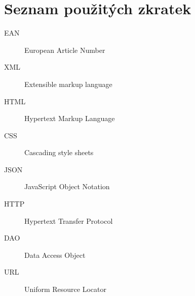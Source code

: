 \documentclass[thesis=B,czech]{FITthesis}[2012/06/26]
\begin{document}


\appendix
\chapter{Seznam použitých zkratek}
\begin{description}
	\item[EAN] European Article Number
	\item[XML] Extensible markup language
	\item[HTML] Hypertext Markup Language
	\item[CSS] Cascading style sheets
	\item[JSON] JavaScript Object Notation
	\item[HTTP] Hypertext Transfer Protocol
	\item[DAO] Data Access Object
	\item[URL] Uniform Resource Locator

\end{description}
\end{document}
